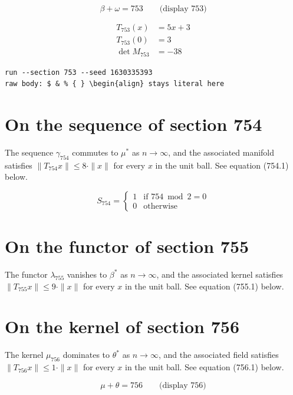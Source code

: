\documentclass{article}
\begin{document}
$$
\beta + \omega = 753 \qquad \text{(display 753)}
$$

\begin{align}
T_{753}(x) &= 5 x + 3 \\
T_{753}(0) &= 3 \\
\det M_{753} &= -38
\end{align}

\begin{verbatim}
run --section 753 --seed 1630335393
raw body: $ & % { } \begin{align} stays literal here
\end{verbatim}

\section{On the sequence of section 754}
The sequence $\gamma_{754}$ commutes to $\mu^{*}$ as $n \to \infty$,
and the associated manifold satisfies $\|T_{754} x\| \leq 8 \cdot \|x\|$
for every $x$ in the unit ball. See equation (754.1) below.

\begin{equation}
S_{754} = \begin{cases} 1 & \text{if } 754 \bmod 2 = 0 \\ 0 & \text{otherwise} \end{cases}
\end{equation}

\section{On the functor of section 755}
The functor $\lambda_{755}$ vanishes to $\beta^{*}$ as $n \to \infty$,
and the associated kernel satisfies $\|T_{755} x\| \leq 9 \cdot \|x\|$
for every $x$ in the unit ball. See equation (755.1) below.

\section{On the kernel of section 756}
The kernel $\mu_{756}$ dominates to $\theta^{*}$ as $n \to \infty$,
and the associated field satisfies $\|T_{756} x\| \leq 1 \cdot \|x\|$
for every $x$ in the unit ball. See equation (756.1) below.

$$
\mu + \theta = 756 \qquad \text{(display 756)}
$$
\end{document}
